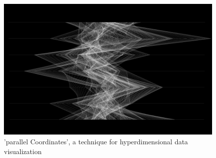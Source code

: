 \begin{figure}[H]
  \centering
  \includegraphics[width=\textwidth]{img/hyperDim.PNG}
  \caption[shortCaption]
  {'parallel Coordinates', a technique for hyperdimensional data visualization}
  \label{fig:label}
\end{figure}


